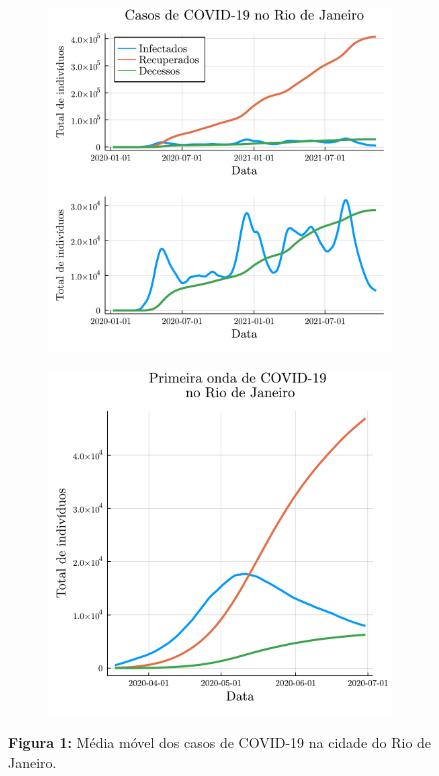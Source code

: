 \documentclass[a4paper,12pt]{article}
\begin{document}
\begin{figure}[h]
	\centering
	
	\begin{subfigure}{.5\textwidth}
		\centering
		\includegraphics[width=.85\linewidth]{covid_cases}
	\end{subfigure}%
	\begin{subfigure}{.5\textwidth}
		\centering
		\includegraphics[width=.85\linewidth]{covid_wave}
	\end{subfigure}

	\caption*{\textbf{Figura 1:} Média móvel dos casos de COVID-19 na cidade do Rio de Janeiro.}
\end{figure}
\end{document}
